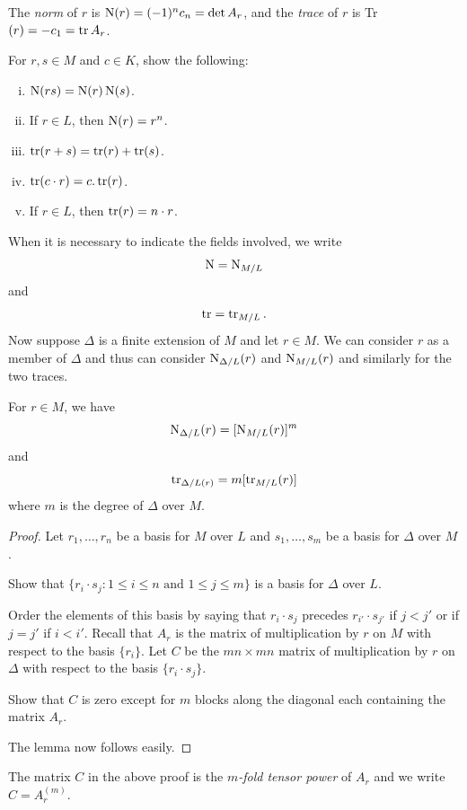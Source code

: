 \begin{defi}
\label{d2.5.12}
The {\it norm} of $r$ is $\operatorname{N}(r)=(-1)^{n}c_{n}=\det A_{r}$, and the {\it trace}
of $r$ is Tr $(r)=-c_{1}= \operatorname{tr}A_{r}$.
\end{defi}

\begin{exo}
\label{e2.5.4}
For $r,s\in M$ and $c\in K$, show the following:
\begin{enumerate}[(i)]
\item
$\operatorname{N}(rs)=\operatorname{N}(r)\operatorname{N}(s)$.
\item
If $r\in L$, then $\operatorname{N}(r)=r^{n}$.
\item
$\operatorname{tr}(r+s)= \operatorname{tr}(r)+ \operatorname{tr}(s)$.
\item
$\operatorname{tr}(c\cdot r)=c. \operatorname{tr}(r)$.
\item
If $r\in L$, then $\operatorname{tr}(r)=n\cdot r$.
\end{enumerate}
\end{exo}

When it is necessary to indicate the fields involved, we write
$$
\operatorname{N}=\operatorname{N}_{M/L}
$$
and
$$
\operatorname{tr}=\operatorname{tr}_{M/L} .
$$
Now suppose $\Delta$ is a finite extension of $M$ and let $r\in M$. We can consider $r$ as a member of $\Delta$ and thus can consider $\operatorname{N}_{\Delta/L}(r)$ and $\operatorname{N}_{M/L}(r)$ and similarly for the two traces.

\begin{prop}
\label{p2.5.8}
For $r\in M$, we have
$$
\operatorname{N}_{\Delta/L}(r)=[\operatorname{N}_{M/L}(r)]^{m}
$$
and
$$
\operatorname{tr}_{\Delta/L(r)}=m[\operatorname{tr}_{M/L}(r)]
$$
where $m$ is the degree of $\Delta$ over $M$.
\end{prop}

\begin{proof}
Let $r_{1},\ldots,r_{n}$ be a basis for $M$ over $L$ and $s_{1},\ldots,s_{m}$ be a basis for $\Delta$ over $M$.

\begin{exo}
\label{e2.5.5}
Show that $\{r_{i}\cdot s_{j}: 1\leq i\leq n \text{ and }
 1\leq j\leq m\}$ is a basis for $\Delta$ over $L$.
\end{exo}

Order the elements of this basis by saying that $r_{i}\cdot s_{j}$ precedes $r_{i'}\cdot s_{j'}$ if $j<j'$ or if $j=j'$ if $i<i'$. Recall that $A_{r}$ is the matrix of multiplication by $r$ on $M$ with respect to the basis $\{r_{i}\}$. Let $C$ be the $mn \times mn$ matrix of multiplication by $r$ on $\Delta$ with respect to the basis $\{r_{i}\cdot s_{j}\}$.

\begin{exo}
\label{e2.5.6}
Show that $C$ is zero except for $m$ blocks along the diagonal each containing the matrix $A_{r}$.
\end{exo}

The lemma now follows easily.
\end{proof}
The matrix $C$ in the above proof is the {\it $m$-fold tensor power} of $A_{r}$ and we write $C=A_{r}^{(m)}$.

